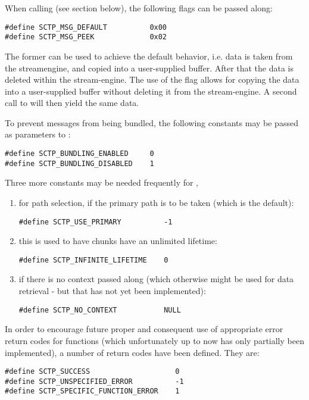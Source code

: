 \documentclass[10pt]{article}
\newcommand{\n}{\normalsize}
\begin{document}
\noindent
When calling  (see section below), the following flags 
can be passed along:
\footnotesize
\begin{verbatim}
#define SCTP_MSG_DEFAULT          0x00
#define SCTP_MSG_PEEK             0x02
\end{verbatim}\n
\noindent
The former can be used to achieve the default behavior, i.e. data is taken
from the streamengine, and copied into a user-supplied buffer. After that 
the data is deleted within the stream-engine.
The use of the  flag allows for copying the data
into a user-supplied buffer without deleting it from the stream-engine.
A second call to  will then yield the same data.

To prevent messages from being bundled, the following constants may be passed
as parameters to   :
\footnotesize
\begin{verbatim}
#define SCTP_BUNDLING_ENABLED     0
#define SCTP_BUNDLING_DISABLED    1
\end{verbatim}\n
\noindent
Three more constants may be needed frequently for ,
\begin{enumerate}
\item for path selection, if the primary path is to be taken
(which is the default):
\footnotesize
\begin{verbatim}
#define SCTP_USE_PRIMARY          -1
\end{verbatim}\n
\item this is used to have chunks have an unlimited lifetime:
\footnotesize
\begin{verbatim}
#define SCTP_INFINITE_LIFETIME    0
\end{verbatim}\n
\item if there is no context passed along (which otherwise might be used for
data retrieval - but that has not yet been implemented):
\footnotesize
\begin{verbatim}
#define SCTP_NO_CONTEXT           NULL
\end{verbatim}\n
\end{enumerate}
\noindent
In order to encourage future proper and consequent use of appropriate error
return codes for functions (which unfortunately up to now has only partially been
implemented), a number of return codes have been defined. They are:
\footnotesize
\begin{verbatim}
#define SCTP_SUCCESS                    0
#define SCTP_UNSPECIFIED_ERROR          -1
#define SCTP_SPECIFIC_FUNCTION_ERROR    1
\end{verbatim}\n
\end{document}
